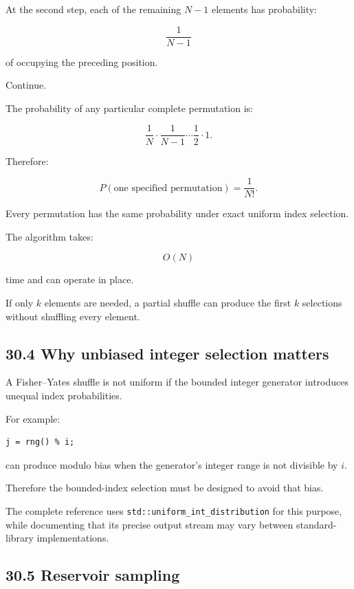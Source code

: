 At the second step, each of the remaining \(N-1\) elements has probability:

\[ \frac1{N-1} \]

of occupying the preceding position.

Continue.

The probability of any particular complete permutation is:

\[ \frac1N \cdot \frac1{N-1} \cdots \frac12 \cdot1. \]

Therefore:

\[ \boxed{ P(\text{one specified permutation})=\frac1{N!} }. \]

Every permutation has the same probability under exact uniform index selection.

The algorithm takes:

\[ \boxed{O(N)} \]

time and can operate in place.

If only \(k\) elements are needed, a partial shuffle can produce the first \(k\) selections without shuffling every element.

\subsection{30.4 Why unbiased integer selection matters}\label{02-foundations-ii-ch031-why-unbiased-integer-selection-matters}

A Fisher--Yates shuffle is not uniform if the bounded integer generator introduces unequal index probabilities.

For example:

\begin{verbatim}
j = rng() % i;
\end{verbatim}

can produce modulo bias when the generator's integer range is not divisible by \(i\).

Therefore the bounded-index selection must be designed to avoid that bias.

The complete reference uses \texttt{std::uniform\_int\_distribution} for this purpose, while documenting that its precise output stream may vary between standard-library implementations.

\subsection{30.5 Reservoir sampling}\label{02-foundations-ii-ch031-reservoir-sampling}

